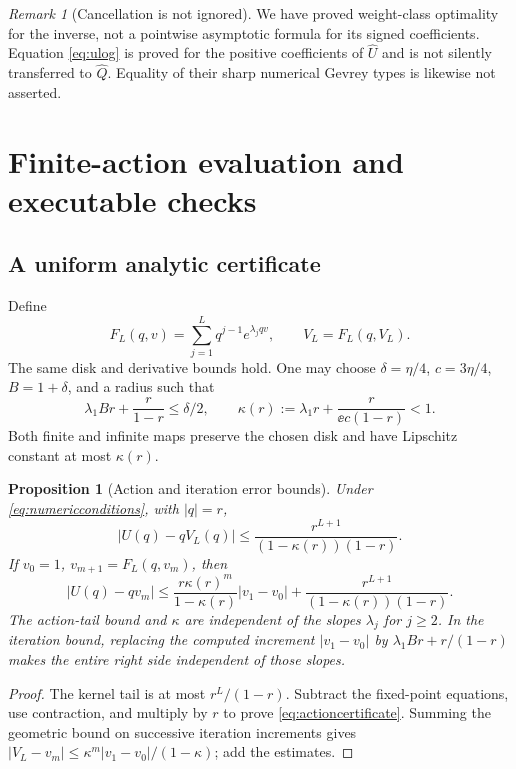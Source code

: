 \documentclass[11pt,a4paper]{article}
\numberwithin{equation}{section}
\newtheorem{proposition}[theorem]{Proposition}
\theoremstyle{definition}\newtheorem{definition}[theorem]{Definition}
\theoremstyle{remark}\newtheorem{remark}[theorem]{Remark}
\newcommand{\Uhat}{\widehat U}\newcommand{\Qhat}{\widehat Q}\newcommand{\Vhat}{\widehat V}
\begin{document}
\begin{remark}[Cancellation is not ignored]
We have proved weight-class optimality for the inverse, not a pointwise
asymptotic formula for its signed coefficients. Equation \eqref{eq:ulog}
is proved for the positive coefficients of $\Uhat$ and is not silently
transferred to $\Qhat$. Equality of their sharp numerical Gevrey types
is likewise not asserted.
\end{remark}

\section{Finite-action evaluation and executable checks}
\label{sec:numerics}
\subsection{A uniform analytic certificate}
Define
\begin{equation}
 F_L(q,v)=\sum_{j=1}^Lq^{j-1}e^{\lambda_jqv},\qquad V_L=F_L(q,V_L).
 \label{eq:finitekernel}
\end{equation}
The same disk and derivative bounds hold. One may choose
$\delta=\eta/4$, $c=3\eta/4$, $B=1+\delta$, and a radius such that
\begin{equation}
 \lambda_1Br+\frac r{1-r}\le\delta/2,
 \qquad \kappa(r):=\lambda_1r+\frac r{\ee c(1-r)}<1.
 \label{eq:numericconditions}
\end{equation}
Both finite and infinite maps preserve the chosen disk and have
Lipschitz constant at most $\kappa(r)$.

\begin{proposition}[Action and iteration error bounds]
\label{prop:certificate}
Under \eqref{eq:numericconditions}, with $|q|=r$,
\begin{equation}
 |U(q)-qV_L(q)|\le\frac{r^{L+1}}{(1-\kappa(r))(1-r)}.
 \label{eq:actioncertificate}
\end{equation}
If $v_0=1$, $v_{m+1}=F_L(q,v_m)$, then
\begin{equation}
 \boxed{\quad
 |U(q)-qv_m|\le
 \frac{r\kappa(r)^m}{1-\kappa(r)}|v_1-v_0|
 +\frac{r^{L+1}}{(1-\kappa(r))(1-r)}.
 \quad}
 \label{eq:fullcertificate}
\end{equation}
The action-tail bound and $\kappa$ are independent of the slopes
$\lambda_j$ for $j\ge2$. In the iteration bound, replacing the computed
increment $|v_1-v_0|$ by $\lambda_1Br+r/(1-r)$ makes the entire
right side independent of those slopes.
\end{proposition}
\begin{proof}
The kernel tail is at most $r^L/(1-r)$. Subtract the fixed-point equations,
use contraction, and multiply by $r$ to prove
\eqref{eq:actioncertificate}. Summing the geometric bound on successive
iteration increments gives
$|V_L-v_m|\le\kappa^m|v_1-v_0|/(1-\kappa)$; add the estimates.
\end{proof}
\end{document}
